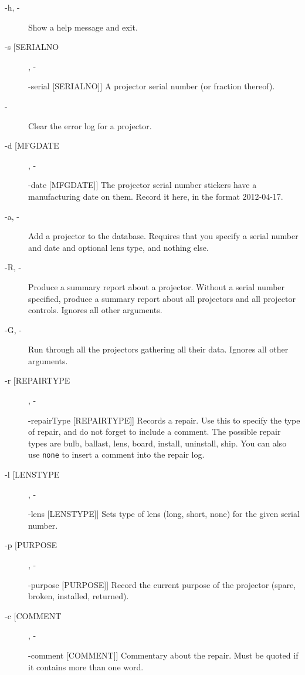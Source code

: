 \documentclass[11pt]{article}
\newcommand{\cmd}[1]{\texttt{#1}\xspace}
\newcommand{\longcommand}[1]{-\rule{0pt}{1pt}-#1}
\newcommand{\argle}[1]{[#1]}
\begin{document}
\begin{description}
\item[-h, \longcommand{help}] Show a help message and exit.
\item[-s \argle{SERIALNO}, \longcommand{serial} \argle{SERIALNO}]
                        A projector serial number (or fraction
                        thereof).
\item[\longcommand{clearErrs}]   Clear the error log for a projector.
\item[-d \argle{MFGDATE}, \longcommand{date} \argle{MFGDATE}]
                        The projector serial number stickers have a
                        manufacturing date on them. Record it here, in the
                        format 2012-04-17.
\item[-a, \longcommand{add}] Add a projector to the
                        database. Requires that you specify a serial number
                        and date and optional lens type, and nothing else.
\item[-R, \longcommand{report}]     Produce a summary report about a projector. Without a
                        serial number specified, produce a summary report
                        about all projectors and all projector controls.
                        Ignores all other arguments.
\item[-G, \longcommand{gather}]    Run through all the projectors gathering all their
                        data. Ignores all other arguments.
\item[-r \argle{REPAIRTYPE}, \longcommand{repairType} \argle{REPAIRTYPE}]
                        Records a repair. Use this to
                        specify the type of repair, and do not forget to
                        include a comment.  The possible repair types
                        are bulb, ballast, lens, board, install,
                        uninstall, ship.  You can also use \cmd{none} to
                        insert a comment into the repair log.
\item[-l \argle{LENSTYPE}, \longcommand{lens} \argle{LENSTYPE}]
                        Sets type of lens (long, short, none) for the given
                        serial number.
\item[-p \argle{PURPOSE}, \longcommand{purpose} \argle{PURPOSE}]
                        Record the current purpose of the projector (spare,
                        broken, installed, returned).
\item[-c \argle{COMMENT}, \longcommand{comment} \argle{COMMENT}]
                        Commentary about the repair.  Must be quoted
                        if it contains more than one word.

                      \end{description}
                      
\end{document}
